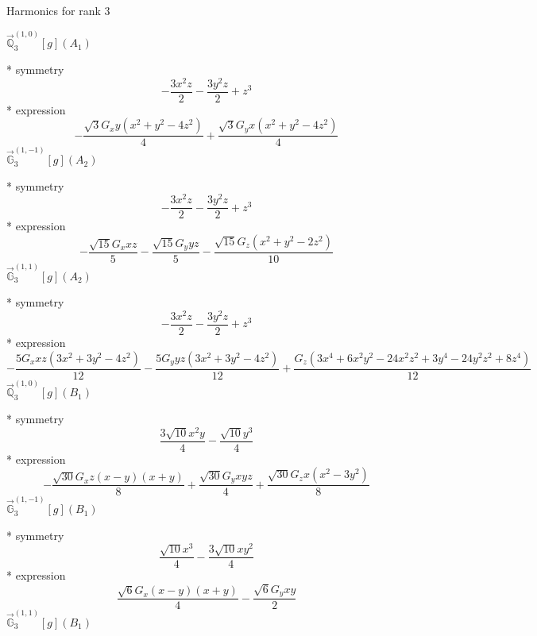 \documentclass[fleqn,8pt]{jsarticle}
\begin{document}
\noindent * Harmonics for rank 3

\noindent\quad $\vec{\mathbb{Q}}_{3}^{(1,0)}[g](A_{1})$

\noindent\quad ** symmetry
\begin{dmath*}
- \frac{3 x^{2} z}{2} - \frac{3 y^{2} z}{2} + z^{3}
\end{dmath*}
\noindent\quad ** expression
\begin{dmath*}
- \frac{\sqrt{3} G_{x} y \left(x^{2} + y^{2} - 4 z^{2}\right)}{4} + \frac{\sqrt{3} G_{y} x \left(x^{2} + y^{2} - 4 z^{2}\right)}{4}
\end{dmath*}
\noindent\quad $\vec{\mathbb{G}}_{3}^{(1,-1)}[g](A_{2})$

\noindent\quad ** symmetry
\begin{dmath*}
- \frac{3 x^{2} z}{2} - \frac{3 y^{2} z}{2} + z^{3}
\end{dmath*}
\noindent\quad ** expression
\begin{dmath*}
- \frac{\sqrt{15} G_{x} x z}{5} - \frac{\sqrt{15} G_{y} y z}{5} - \frac{\sqrt{15} G_{z} \left(x^{2} + y^{2} - 2 z^{2}\right)}{10}
\end{dmath*}
\noindent\quad $\vec{\mathbb{G}}_{3}^{(1,1)}[g](A_{2})$

\noindent\quad ** symmetry
\begin{dmath*}
- \frac{3 x^{2} z}{2} - \frac{3 y^{2} z}{2} + z^{3}
\end{dmath*}
\noindent\quad ** expression
\begin{dmath*}
- \frac{5 G_{x} x z \left(3 x^{2} + 3 y^{2} - 4 z^{2}\right)}{12} - \frac{5 G_{y} y z \left(3 x^{2} + 3 y^{2} - 4 z^{2}\right)}{12} + \frac{G_{z} \left(3 x^{4} + 6 x^{2} y^{2} - 24 x^{2} z^{2} + 3 y^{4} - 24 y^{2} z^{2} + 8 z^{4}\right)}{12}
\end{dmath*}
\noindent\quad $\vec{\mathbb{Q}}_{3}^{(1,0)}[g](B_{1})$

\noindent\quad ** symmetry
\begin{dmath*}
\frac{3 \sqrt{10} x^{2} y}{4} - \frac{\sqrt{10} y^{3}}{4}
\end{dmath*}
\noindent\quad ** expression
\begin{dmath*}
- \frac{\sqrt{30} G_{x} z \left(x - y\right) \left(x + y\right)}{8} + \frac{\sqrt{30} G_{y} x y z}{4} + \frac{\sqrt{30} G_{z} x \left(x^{2} - 3 y^{2}\right)}{8}
\end{dmath*}
\noindent\quad $\vec{\mathbb{G}}_{3}^{(1,-1)}[g](B_{1})$

\noindent\quad ** symmetry
\begin{dmath*}
\frac{\sqrt{10} x^{3}}{4} - \frac{3 \sqrt{10} x y^{2}}{4}
\end{dmath*}
\noindent\quad ** expression
\begin{dmath*}
\frac{\sqrt{6} G_{x} \left(x - y\right) \left(x + y\right)}{4} - \frac{\sqrt{6} G_{y} x y}{2}
\end{dmath*}
\noindent\quad $\vec{\mathbb{G}}_{3}^{(1,1)}[g](B_{1})$
\end{document}
